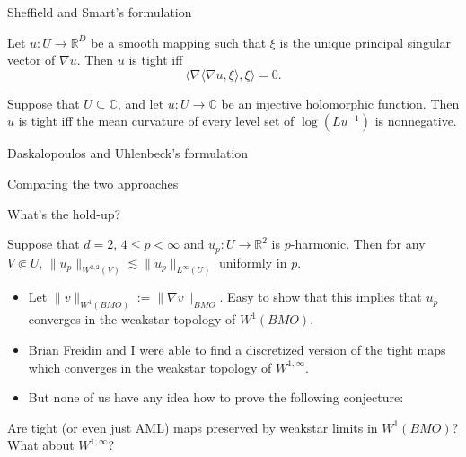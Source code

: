 \documentclass[10pt]{beamer}
\newcommand{\RR}{\mathbb{R}}
\newcommand{\CC}{\mathbb{C}}
\begin{document}
\begin{frame}{Sheffield and Smart's formulation}
\begin{theorem}
Let $u: U \to \RR^D$ be a smooth mapping such that $\xi$ is the unique principal singular vector of $\nabla u$.
Then $u$ is tight iff 
$$\langle \nabla \langle \nabla u, \xi\rangle, \xi\rangle = 0.$$
\end{theorem}

\begin{theorem}
Suppose that $U \subseteq \CC$, and let $u: U \to \CC$ be an injective holomorphic function.
Then $u$ is tight iff the mean curvature of every level set of $\log(Lu^{-1})$ is nonnegative.
\end{theorem}
    
\end{frame}

\begin{frame}{Daskalopoulos and Uhlenbeck's formulation}
    
\end{frame}

\begin{frame}{Comparing the two approaches}
    
\end{frame}

\begin{frame}{What's the hold-up?}
\begin{theorem} 
Suppose that $d = 2$, $4 \leq p < \infty$ and $u_p: U \to \RR^2$ is $p$-harmonic.
Then for any $V \Subset U$, $\|u_p\|_{W^{2, 2}(V)} \lesssim \|u_p\|_{L^\infty(U)}$ uniformly in $p$.
\end{theorem}

\begin{itemize}
\item Let $\|v\|_{W^1(BMO)} := \|\nabla v\|_{BMO}$. Easy to show that this implies that $u_p$ converges in the weakstar topology of $W^1(BMO)$.
\item Brian Freidin and I were able to find a discretized version of the tight maps which converges in the weakstar topology of $W^{1, \infty}$.
\item But none of us have any idea how to prove the following conjecture:
\end{itemize}

\begin{problem}
Are tight (or even just AML) maps preserved by weakstar limits in $W^1(BMO)$? What about $W^{1, \infty}$?
\end{problem}
\end{frame}
\end{document}
